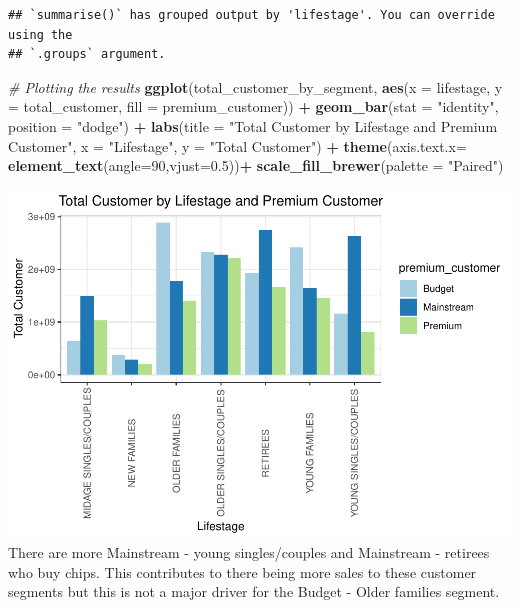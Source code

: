 \documentclass[
]{article}
\newenvironment{Shaded}{\begin{snugshade}}{\end{snugshade}}
\newcommand{\AttributeTok}[1]{\textcolor[rgb]{0.13,0.29,0.53}{#1}}
\newcommand{\CommentTok}[1]{\textcolor[rgb]{0.56,0.35,0.01}{\textit{#1}}}
\newcommand{\DecValTok}[1]{\textcolor[rgb]{0.00,0.00,0.81}{#1}}
\newcommand{\FloatTok}[1]{\textcolor[rgb]{0.00,0.00,0.81}{#1}}
\newcommand{\FunctionTok}[1]{\textcolor[rgb]{0.13,0.29,0.53}{\textbf{#1}}}
\newcommand{\NormalTok}[1]{#1}
\newcommand{\SpecialCharTok}[1]{\textcolor[rgb]{0.81,0.36,0.00}{\textbf{#1}}}
\newcommand{\StringTok}[1]{\textcolor[rgb]{0.31,0.60,0.02}{#1}}
\begin{document}
\begin{verbatim}
## `summarise()` has grouped output by 'lifestage'. You can override using the
## `.groups` argument.
\end{verbatim}

\begin{Shaded}
\begin{Highlighting}[]
\CommentTok{\# Plotting the results}
\FunctionTok{ggplot}\NormalTok{(total\_customer\_by\_segment, }\FunctionTok{aes}\NormalTok{(}\AttributeTok{x =}\NormalTok{ lifestage, }\AttributeTok{y =}\NormalTok{ total\_customer, }\AttributeTok{fill =}\NormalTok{ premium\_customer)) }\SpecialCharTok{+}
  \FunctionTok{geom\_bar}\NormalTok{(}\AttributeTok{stat =} \StringTok{"identity"}\NormalTok{, }\AttributeTok{position =} \StringTok{"dodge"}\NormalTok{) }\SpecialCharTok{+}
  \FunctionTok{labs}\NormalTok{(}\AttributeTok{title =} \StringTok{"Total Customer by Lifestage and Premium Customer"}\NormalTok{,}
       \AttributeTok{x =} \StringTok{"Lifestage"}\NormalTok{,}
       \AttributeTok{y =} \StringTok{"Total Customer"}\NormalTok{) }\SpecialCharTok{+}
  \FunctionTok{theme}\NormalTok{(}\AttributeTok{axis.text.x=} \FunctionTok{element\_text}\NormalTok{(}\AttributeTok{angle=}\DecValTok{90}\NormalTok{,}\AttributeTok{vjust=}\FloatTok{0.5}\NormalTok{))}\SpecialCharTok{+}
  \FunctionTok{scale\_fill\_brewer}\NormalTok{(}\AttributeTok{palette =} \StringTok{"Paired"}\NormalTok{)}
\end{Highlighting}
\end{Shaded}

\includegraphics{quantium_analysis_files/figure-latex/unnamed-chunk-31-1.pdf}
There are more Mainstream - young singles/couples and Mainstream -
retirees who buy chips. This contributes to there being more sales to
these customer segments but this is not a major driver for the Budget -
Older families segment.
\end{document}
